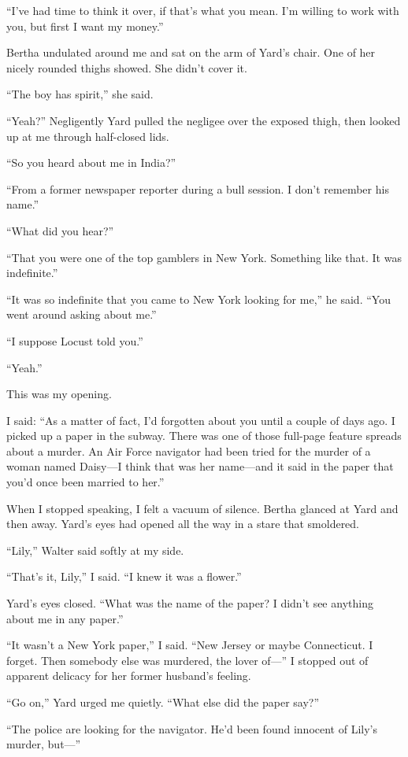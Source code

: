 \documentclass{novel}
\begin{document}
“I’ve had time to think it over, if that’s what you mean. I’m willing to work with you, but first I want my money.”

Bertha undulated around me and sat on the arm of Yard’s chair. One of her nicely rounded thighs showed. She didn’t cover it.

“The boy has spirit,” she said.

“Yeah?” Negligently Yard pulled the negligee over the exposed thigh, then looked up at me through half-closed lids.

“So you heard about me in India?”

“From a former newspaper reporter during a bull session. I don’t remember his name.”

“What did you hear?”

“That you were one of the top gamblers in New York. Something like that. It was indefinite.”

“It was so indefinite that you came to New York looking for me,” he said. “You went around asking about me.”

“I suppose Locust told you.”

“Yeah.”

\scenestars

This was my opening.

I said: “As a matter of fact, I’d forgotten about you until a couple of days ago. I picked up a paper in the subway. There was one of those full-page feature spreads about a murder. An Air Force navigator had been tried for the murder of a woman named Daisy—I think that was her name—and it said in the paper that you’d once been married to her.”

When I stopped speaking, I felt a vacuum of silence. Bertha glanced at Yard and then away. Yard’s eyes had opened all the way in a stare that smoldered.

“Lily,” Walter said softly at my side.

“That’s it, Lily,” I said. “I knew it was a flower.”

Yard’s eyes closed. “What was the name of the paper? I didn’t see anything about me in any paper.”

“It wasn’t a New York paper,” I said. “New Jersey or maybe Connecticut. I forget. Then somebody else was murdered, the lover of—” I stopped out of apparent delicacy for her former husband’s feeling.

“Go on,” Yard urged me quietly. “What else did the paper say?”

“The police are looking for the navigator. He’d been found innocent of Lily’s murder, but—”
\end{document}
